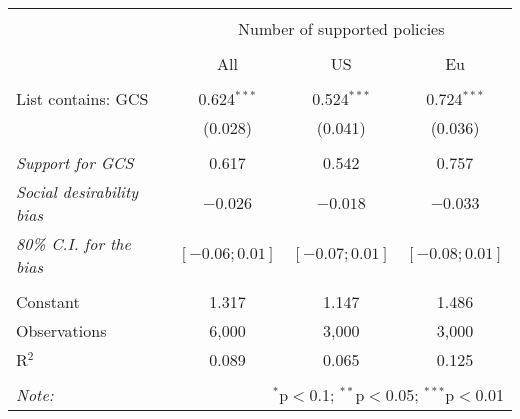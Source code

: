 
\begin{tabular}{@{\extracolsep{5pt}}lccc} 
\\[-1.8ex]\hline 
\hline \\[-1.8ex] 
 & \multicolumn{3}{c}{Number of supported policies} \\ 
\cline{2-4} 
\\[-1.8ex] & All & US & Eu \\ 
\hline \\[-1.8ex] 
 List contains: GCS & 0.624$^{***}$ & 0.524$^{***}$ & 0.724$^{***}$ \\ 
  & (0.028) & (0.041) & (0.036) \\ 
\hline  \\[-1.8ex] \textit{Support for GCS} & 0.617  &  0.542  &  0.757 \\
\textit{Social desirability bias} & \textit{$ -0.026 $} & \textit{$ -0.018 $} & \textit{$ -0.033 $}\\
\textit{80\% C.I. for the bias} & \textit{ $[ -0.06 ; 0.01 ]$ } & \textit{ $[ -0.07 ; 0.01 ]$} & \textit{ $[ -0.08 ; 0.01 ]$}\\
 \hline \\[-1.8ex] 
Constant & 1.317 & 1.147 & 1.486 \\ 
Observations & 6,000 & 3,000 & 3,000 \\ 
R$^{2}$ & 0.089 & 0.065 & 0.125 \\ 
\hline 
\hline \\[-1.8ex] 
\textit{Note:}  & \multicolumn{3}{r}{$^{*}$p$<$0.1; $^{**}$p$<$0.05; $^{***}$p$<$0.01} \\ 
\end{tabular} 